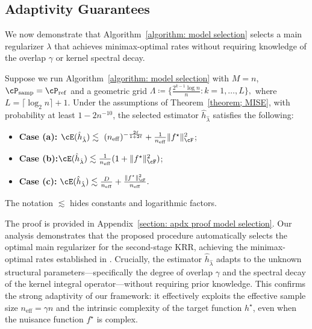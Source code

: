 \documentclass[english,11pt]{article}
\begin{document}
\subsection{Adaptivity Guarantees}\label{section: model selection}

We now demonstrate that Algorithm~\ref{algorithm: model selection} selects a main regularizer $\lambda$ that achieves minimax-optimal rates without requiring knowledge of the overlap $\gamma$ or kernel spectral decay.

\begin{theorem}\label{theorem; model selection}
    Suppose we run Algorithm~\ref{algorithm: model selection} with $M =n$, $\cP_{\operatorname{samp}} = \cP_{\operatorname{ref}}$ and a geometric grid \(
\Lambda \coloneqq\{ \frac{2^{k-1} \log n}{n} : k = 1,\dotsc,L \},
\) where $L = \lceil \log_2 n \rceil + 1$. Under the assumptions of Theorem~\ref{theorem; MISE}, with probability at least $1 - 2n^{-10}$, the selected estimator $\hat{h}_{\hat{\lambda}}$ satisfies the following:
\begin{itemize}
        \item \textbf{Case (a):} \quad \(\cE(\hat h_{\hat{\lambda}}) \lesssim \ (n_{\operatorname{eff}})^{-\frac{2\ell}{1+2\ell}} + \frac{1}{n_{\operatorname{eff}}} \|f^\star\|_\cF^2\);
        \item \textbf{Case (b):}\quad \(\cE(\hat h_{\hat{\lambda}}) \lesssim  \frac{1}{n_{\operatorname{eff}}} (1+ \|f^\star\|_\cF^2)\);
        \item \textbf{Case (c):} \quad  \(\cE(\hat h_{\hat{\lambda}}) \lesssim   \frac{D}{n_{\operatorname{eff}}} + \frac{\|f^\star\|_\cF^2}{n_{\operatorname{eff}}}.\)
\end{itemize}
The notation \(\lesssim\) hides constants and logarithmic factors.
\end{theorem}
The proof is provided in Appendix~\ref{section: apdx proof model selection}.
Our analysis demonstrates that the proposed procedure automatically selects the optimal main regularizer for the second-stage KRR, achieving the minimax-optimal rates established in .
Crucially, the estimator $\hat{h}_{\hat{\lambda}}$ adapts to the unknown structural parameters—specifically the degree of overlap $\gamma$ and the spectral decay of the kernel integral operator—without requiring prior knowledge.
This confirms the strong adaptivity of our framework: it effectively exploits the effective sample size $n_{\operatorname{eff}} = \gamma n$ and the intrinsic complexity of the target function $h^\star$, even when the nuisance function $f^\star$ is complex.
\end{document}
